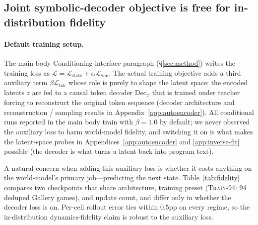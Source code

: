 \subsection{Joint symbolic-decoder objective is free for in-distribution fidelity}
\label{app:joint-decoder}

\paragraph{Default training setup.}
The main-body Conditioning interface paragraph
(\S\ref{sec:method}) writes the training loss as
$\mathcal{L} = \mathcal{L}_{\text{state}} + \alpha \mathcal{L}_{\text{win}}$.
The actual training objective adds a third
auxiliary term $\beta \mathcal{L}_{\text{tok}}$ whose role is purely
to shape the latent space: the encoded latents $z$ are fed to a causal
token decoder $\mathrm{Dec}_\psi$ that is trained under teacher
forcing to reconstruct the original token sequence (decoder
architecture and reconstruction / sampling results in
Appendix~\ref{app:autoencoder}). All conditional runs reported in
the main body train with $\beta = 1.0$ by default; we never observed
the auxiliary loss to harm world-model fidelity, and switching it on
is what makes the latent-space probes in
Appendices~\ref{app:autoencoder} and \ref{app:inverse-fit} possible
(the decoder is what turns a latent back into program text).

A natural concern when adding this auxiliary loss is whether it
costs anything on the world-model's primary job---predicting the
next state. Table~\ref{tab:fidelity} compares two checkpoints that
share architecture, training preset (\textsc{Train-94}: 94 deduped
Gallery games), and update count, and differ only in whether the
decoder loss is on. Per-cell rollout error ties within $0.5$pp on
every regime, so the in-distribution dynamics-fidelity claim is
robust to the auxiliary loss.

\begin{table}[t]
  \centering
  \caption{\textbf{Joint decoder objective is essentially free for
    in-distribution fidelity.} Per-cell rollout error on the 94-game
    \textsc{Train-94} preset for the encoder-only ($\beta = 0$) and
    joint-decoder ($\beta = 1.0$) checkpoints. Mean / median across
    all 94 games (each game's number is the per-rollout-step mean
    across all authored levels, 50 steps for autoregressive regimes /
    level-length for BFS / A*). Every regime ties within $0.5$pp.}
  \label{tab:fidelity}
  \small
  
\end{table}

